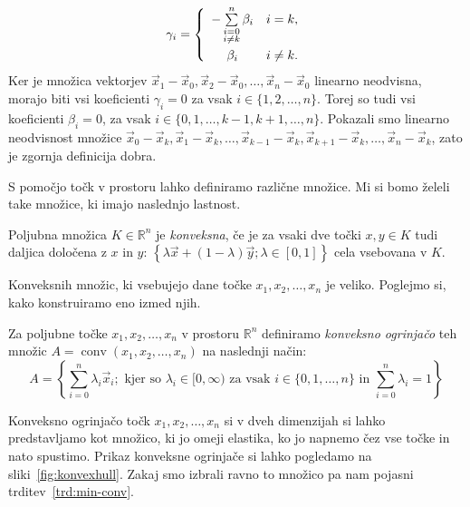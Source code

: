 \documentclass[mat1]{fmfdelo}
\newcommand{\R}{\mathbb R}
\DeclareMathOperator{\conv}{conv}
\newcommand{\0}{\underline{0}}
\begin{document}
\[  \gamma_i =  \left\{
\begin{array}{cl}\vspace{3pt}
	-\sum\limits_{\substack{i=0 \\ i\neq k}}^n \beta_i & i = k,\\
	\beta_i & i \neq k. \\
\end{array} 
\right. \]
Ker je množica vektorjev $\vec{x}_1 - \vec{x}_0, \vec{x}_2 - \vec{x}_0, \dots , \vec{x}_n - \vec{x}_0$ linearno neodvisna, morajo biti vsi koeficienti $\gamma_i = 0$ za vsak $i \in \{1, 2, \dots, n \}$. Torej so tudi vsi koeficienti $\beta_i = 0$, za vsak $i \in \{0, 1, \dots, k-1, k+1, \dots, n \}$. Pokazali smo linearno neodvisnost množice $\vec{x}_0 - \vec{x}_k, \vec{x}_1 - \vec{x}_k, \dots , \vec{x}_{k-1} - \vec{x}_k, \vec{x}_{k+1} - \vec{x}_k, \dots, \vec{x}_n - \vec{x}_k$, zato je zgornja definicija dobra. 

S pomočjo točk v prostoru lahko definiramo različne množice. Mi si bomo želeli take množice, ki imajo naslednjo lastnost.
\begin{definicija}
Poljubna množica $K \in \R^n$ je \emph{konveksna}, če je za vsaki dve točki $x, y \in K$ tudi daljica določena z $x$ in $y$: 
$\left \{ \lambda \vec{x} + (1 - \lambda) \vec{y}; \lambda \in  [0, 1] \right \}$ 
cela vsebovana v $K$.
\end{definicija}
Konveksnih množic, ki vsebujejo dane točke $x_1, x_2, \dots, x_n$ je veliko. Poglejmo si, kako konstruiramo eno izmed njih.
\begin{definicija}
Za poljubne točke $x_1, x_2, \dots, x_n$ v prostoru $\R^n$ definiramo \emph{konveksno ogrinjačo} teh množic $A = \conv(x_1, x_2, \dots, x_n)$ na naslednji način:
$$A = \left \{ \sum\limits_{i=0}^n \lambda_i \vec{x}_i; \text{ kjer so } \lambda_i \in [0, \infty) \text{ za vsak } i \in \{0, 1, \dots, n \} \text{ in } \sum\limits_{i=0}^n \lambda_i = 1  \right \}$$
\end{definicija}
Konveksno ogrinjačo točk $x_1, x_2, \dots, x_n$ si v dveh dimenzijah si lahko predstavljamo kot množico, ki jo omeji elastika, ko jo napnemo čez vse točke in nato spustimo. Prikaz konveksne ogrinjače si lahko pogledamo na sliki~\ref{fig:konvexhull}. Zakaj smo izbrali ravno to množico pa nam pojasni trditev~\ref{trd:min-conv}.
\end{document}
